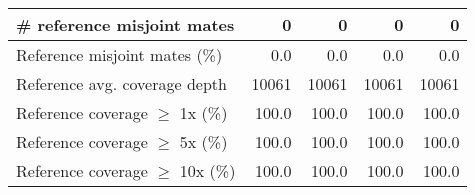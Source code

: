 \documentclass[12pt,a4paper]{article}
\begin{document}
\begin{table}[ht]
\begin{center}
\begin{tabular}{|l*{4}{|r}|}
\# reference misjoint mates & 0 & 0 & 0 & 0 \\ \hline
Reference misjoint mates (\%) & 0.0 & 0.0 & 0.0 & 0.0 \\ \hline
Reference avg. coverage depth & 10061 & 10061 & 10061 & 10061 \\ \hline
Reference coverage $\geq$ 1x (\%) & 100.0 & 100.0 & 100.0 & 100.0 \\ \hline
Reference coverage $\geq$ 5x (\%) & 100.0 & 100.0 & 100.0 & 100.0 \\ \hline
Reference coverage $\geq$ 10x (\%) & 100.0 & 100.0 & 100.0 & 100.0 \\ \hline
\end{tabular}
\end{center}
\end{table}
\end{document}
